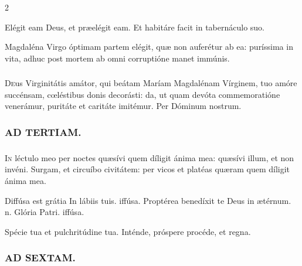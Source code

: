 \documentclass[9pt,twoside]{extarticle}
\begin{document}
\begin{multicols}{2}
\begin{tightlist}{}
\item {} Elégit eam Deus, et præelégit eam.  Et habitáre facit in tabernáculo suo.
\item {} Magdaléna Virgo óptimam partem elégit, quæ non auferétur ab ea: puríssima in vita, adhuc post mortem ab omni corruptióne manet immúnis.
\end{tightlist}

\subsubsection*{\center {}}
\lettrine{D}eus Virginitátis amátor, qui beátam Maríam Magdalénam Vírginem, tuo amóre succénsam, cœléstibus donis decorásti: da, ut quam devóta commemoratióne venerámur, puritáte et caritáte imitémur. Per Dóminum nostrum.

\begin{tightlist}{}
\item {}
\end{tightlist}

\subsubsection*{\center \textsc{AD TERTIAM.}}
\subsubsection*{}
\lettrine{I}n léctulo meo per noctes quæsívi quem díligit ánima mea: quæsívi illum, et non invéni. Surgam, et circuíbo civitátem: per vicos et platéas quæram quem díligit ánima mea.

\begin{tightlist}{}
\item {} Diffúsa est grátia \textred{*} In lábiis tuis. iffúsa.  Proptérea benedíxit te Deus in ætérnum. n. Glória Patri. iffúsa.
\item {} Spécie tua et pulchritúdine tua.  Inténde, próspere procéde, et regna.
\end{tightlist}

\subsubsection*{\center \textsc{AD SEXTAM.}}

\end{multicols}
\end{document}
